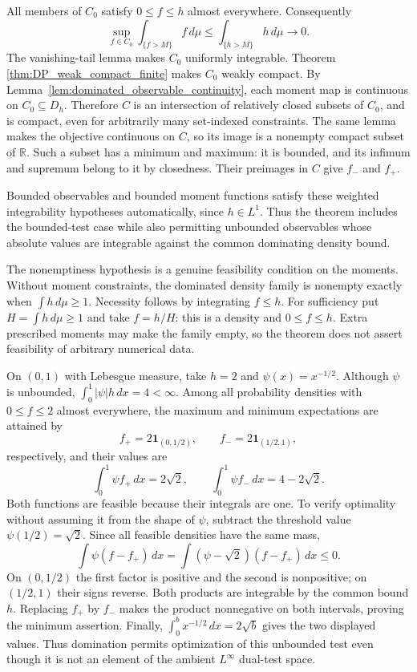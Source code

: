 All members of $C_0$ satisfy $0\leq f\leq h$ almost everywhere. Consequently
\[
\sup_{f\in C_0}\int_{\{f>M\}} f\,d\mu
 \leq\int_{\{h>M\}}h\,d\mu\longrightarrow0.
\]
The vanishing-tail lemma makes $C_0$ uniformly integrable. Theorem~
\ref{thm:DP_weak_compact_finite} makes $C_0$ weakly compact.
By Lemma~\ref{lem:dominated_observable_continuity}, each moment map
is continuous on $C_0\subseteq D_h$. Therefore $C$ is an intersection
of relatively closed subsets of $C_0$, and is compact, even for
arbitrarily many set-indexed constraints. The same lemma makes the
objective continuous on $C$, so its image is a nonempty compact subset of
$\mathbb R$. Such a subset has a minimum and maximum: it is bounded,
and its infimum and supremum belong to it by closedness. Their preimages
in $C$ give $f_-$ and $f_+$.
\Done

Bounded observables and bounded moment functions satisfy these weighted
integrability hypotheses automatically, since $h\in L^1$. Thus the
theorem includes the bounded-test case while also permitting unbounded
observables whose absolute values are integrable against the common
dominating density bound.

The nonemptiness hypothesis is a genuine feasibility condition on the
moments. Without moment constraints, the dominated density family is
nonempty exactly when $\int h\,d\mu\geq1$. Necessity follows by
integrating $f\leq h$. For sufficiency put
$H=\int h\,d\mu\geq1$ and take $f=h/H$: this is a density and
$0\leq f\leq h$. Extra prescribed moments may make the family empty,
so the theorem does not assert feasibility of arbitrary numerical data.

\begin{example}
On $(0,1)$ with Lebesgue measure, take $h=2$ and
$\psi(x)=x^{-1/2}$. Although $\psi$ is unbounded,
$\int_0^1|\psi|h\,dx=4<\infty$. Among all probability densities
with $0\leq f\leq2$ almost everywhere, the maximum and minimum
expectations are attained by
\[
f_+=2\mathbf1_{(0,1/2)},\qquad
f_-=2\mathbf1_{(1/2,1)},
\]
respectively, and their values are
\[
\int_0^1\psi f_+\,dx=2\sqrt2,\qquad
\int_0^1\psi f_-\,dx=4-2\sqrt2.
\]
Both functions are feasible because their integrals are one.
To verify optimality without assuming it from the shape of $\psi$,
subtract the threshold value $\psi(1/2)=\sqrt2$. Since all feasible
densities have the same mass,
\[
\int\psi(f-f_+)\,dx=\int(\psi-\sqrt2)(f-f_+)\,dx\leq0.
\]
On $(0,1/2)$ the first factor is positive and the second is nonpositive;
on $(1/2,1)$ their signs reverse. Both products are integrable by the
common bound $h$. Replacing $f_+$ by $f_-$ makes the product nonnegative
on both intervals, proving the minimum assertion. Finally,
$\int_0^b x^{-1/2}\,dx=2\sqrt b$ gives the two displayed values.
Thus domination permits optimization of this unbounded test even though
it is not an element of the ambient $L^\infty$ dual-test space.
\end{example}

